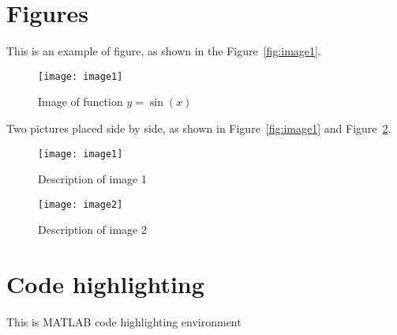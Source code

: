 \documentclass[12pt,en]{homework}
\begin{document}


\section*{Figures}

This is an example of figure, as shown in the Figure~\ref{fig:image1}.

\begin{figure}[htp!]
\centering
\texttt{[image: image1]}
\caption{Image of function $y=\sin(x)$}
\label{fig:sinx}
\end{figure}

Two pictures placed side by side, as shown in Figure~\ref{fig:image1} and Figure~\ref{fig:image2}.

\begin{figure}[!htp]
\begin{minipage}[h]{0.48\linewidth}
\centering
\texttt{[image: image1]}
\caption{Description of image 1}
\label{fig:image1}
\end{minipage}
\begin{minipage}[h]{0.48\linewidth}
\centering
\texttt{[image: image2]}
\caption{Description of image 2}
\label{fig:image2}
\end{minipage}
\end{figure}


\clearpage
\section*{Code highlighting}

This is MATLAB code highlighting environment

\end{document}
